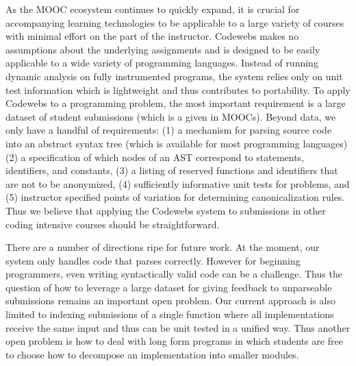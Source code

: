 As the MOOC ecosystem continues to quickly expand, it is crucial for 
accompanying learning technologies to be applicable to a large variety of courses with minimal effort on the part of the instructor.
Codewebs makes no assumptions about the underlying assignments and is designed to be easily applicable to a 
wide variety of programming languages.
Instead of running dynamic analysis on fully instrumented programs, the system relies only on unit test information
which is lightweight and thus contributes to portability.
To apply Codewebs to a programming problem, the most important requirement is a large dataset of student submissions (which is a given in MOOCs).
Beyond data, we only have a handful of requirements:
(1) a mechanism for parsing source code into an abstract syntax tree (which is available for most programming languages)
(2) a specification of which nodes of an AST correspond to statements, identifiers, and constants, 
(3) a listing of reserved functions and identifiers that are not to be anonymized, 
(4) sufficiently informative unit tests for problems, and 
(5) instructor specified
points of variation for determining canonicalization rules.  
Thus we believe that applying the Codewebs system to submissions in other coding intensive courses should be straightforward.

There are a number of directions ripe for future work.
At the moment, our system only handles code that parses correctly.  However for beginning programmers,
even writing syntactically valid code can be a challenge.  Thus the question of how to leverage a large
dataset for giving feedback to unparseable submissions remains an important open problem.  
Our current approach is also limited to indexing submissions of a single function where all implementations receive
the same input and thus can be unit tested in a unified way.
Thus another open problem is how to deal with long form programs in which
students are free to choose how to decompose an implementation into smaller modules.

